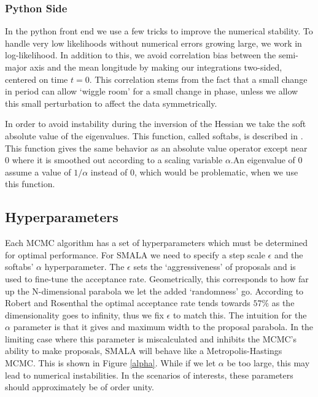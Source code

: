\documentclass{aa}
\begin{document}
\subsubsection{Python Side}
In the python front end we use a few tricks to improve the numerical stability. To handle very low likelihoods without numerical errors growing large, we work in log-likelihood. In addition to this, we avoid correlation bias between the semi-major axis and the mean longitude by making our integrations two-sided, centered on time $t=0$. This correlation stems from the fact that a small change in period can allow `wiggle room' for a small change in phase, unless we allow this small perturbation to affect the data symmetrically.

In order to avoid instability during the inversion of the Hessian we take the soft absolute value of the eigenvalues. This function, called softabs, is described in \cite{softabs}. This function gives the same behavior as an absolute value operator except near $0$ where it is smoothed out according to a scaling variable $\alpha$.An eigenvalue of $0$ assume a value of $1/\alpha$ instead of $0$, which would be problematic, when we use this function.

\subsection{Hyperparameters}\label{hyper}
Each MCMC algorithm has a set of hyperparameters which must be determined for optimal performance. For SMALA we need to specify a step scale $\epsilon$ and the softabs' $\alpha$ hyperparameter. The $\epsilon$ sets the `aggressiveness' of proposals and is used to fine-tune the acceptance rate. Geometrically, this corresponds to how far up the N-dimensional parabola we let the added `randomness' go. According to Robert and Rosenthal \cite{robert1998} the optimal acceptance rate tends towards $57\%$ as the dimensionality goes to infinity, thus we fix $\epsilon$ to match this. The intuition for the $\alpha$ parameter is that it gives and maximum width to the proposal parabola. In the limiting case where this parameter is miscalculated and inhibits the MCMC's ability to make proposals, SMALA will behave like a Metropolis-Hastings MCMC. This is shown in Figure \ref{alpha}. While if we let $\alpha$ be too large, this may lead to numerical instabilities. In the scenarios of interests, these parameters should approximately be of order unity.
\end{document}
